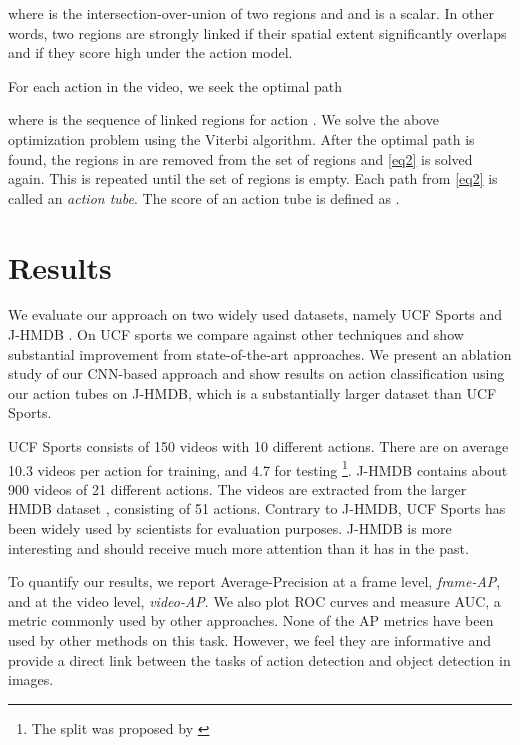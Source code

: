 \documentclass[10pt,twocolumn,letterpaper]{article}
\makeatletter
\renewcommand{\paragraph}{\@startsection{paragraph}{4}{\z@}{1.5ex \@plus 1ex \@minus .2ex}{-0.5em}{\normalfont\normalsize\bfseries}}
\makeatother
\begin{document}
where  is the intersection-over-union of two regions  and  and  is a scalar. In other words, two regions are strongly linked if their spatial extent significantly overlaps and if they score high under the action model.

For each action in the video, we seek the optimal path 


where  is the sequence of linked regions for action . We solve the above optimization problem using the Viterbi algorithm. After the optimal path is found, the regions in  are removed from the set of regions and  \eqref{eq2} is solved again. This is repeated until the set of regions is empty. Each path from \eqref{eq2} is called an \textit{action tube}. The score of an action tube  is defined as .  


 \section{Results}

We evaluate our approach on two widely used datasets, namely UCF Sports \cite{UCFsports} and J-HMDB \cite{J-HMDB}. On UCF sports we compare against other techniques and show substantial improvement from state-of-the-art approaches. We present an ablation study of our CNN-based approach and show results on action classification using our action tubes on J-HMDB, which is a substantially larger dataset than UCF Sports.

\paragraph{Datasets}  UCF Sports consists of 150 videos with 10 different actions. There are on average 10.3 videos per action for training, and 4.7 for testing \footnote{The split was proposed by \cite{LanWM11}}. J-HMDB contains about 900 videos of 21 different actions. The videos are extracted from the larger HMDB dataset \cite{HMDB51}, consisting of 51 actions. Contrary to J-HMDB, UCF Sports has been widely used by scientists for evaluation purposes. J-HMDB is more interesting and should receive much more attention than it has in the past.

\paragraph{Metrics.} To quantify our results, we report Average-Precision at a frame level, \textit{frame-AP}, and at the video level, \textit{video-AP}. We also plot ROC curves and measure AUC, a metric commonly used by other approaches. None of the AP metrics have been used by other methods on this task. However, we feel they are informative and provide a direct link between the tasks of action detection and object detection in images.
\end{document}

